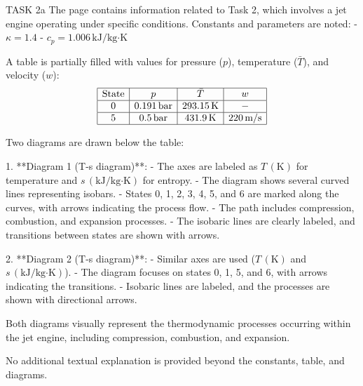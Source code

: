 TASK 2a  
The page contains information related to Task 2, which involves a jet engine operating under specific conditions. Constants and parameters are noted:  
- \( \kappa = 1.4 \)  
- \( c_p = 1.006 \, \text{kJ/kg·K} \)  

A table is partially filled with values for pressure (\( p \)), temperature (\( \bar{T} \)), and velocity (\( w \)):  
\[
\begin{array}{|c|c|c|c|}
\hline
\text{State} & p & \bar{T} & w \\
\hline
0 & 0.191 \, \text{bar} & 293.15 \, \text{K} & - \\
\hline
5 & 0.5 \, \text{bar} & 431.9 \, \text{K} & 220 \, \text{m/s} \\
\hline
\end{array}
\]

Two diagrams are drawn below the table:  

1. **Diagram 1 (T-s diagram)**:  
   - The axes are labeled as \( T \, (\text{K}) \) for temperature and \( s \, (\text{kJ/kg·K}) \) for entropy.  
   - The diagram shows several curved lines representing isobars.  
   - States 0, 1, 2, 3, 4, 5, and 6 are marked along the curves, with arrows indicating the process flow.  
   - The path includes compression, combustion, and expansion processes.  
   - The isobaric lines are clearly labeled, and transitions between states are shown with arrows.  

2. **Diagram 2 (T-s diagram)**:  
   - Similar axes are used (\( T \, (\text{K}) \) and \( s \, (\text{kJ/kg·K}) \)).  
   - The diagram focuses on states 0, 1, 5, and 6, with arrows indicating the transitions.  
   - Isobaric lines are labeled, and the processes are shown with directional arrows.  

Both diagrams visually represent the thermodynamic processes occurring within the jet engine, including compression, combustion, and expansion.  

No additional textual explanation is provided beyond the constants, table, and diagrams.